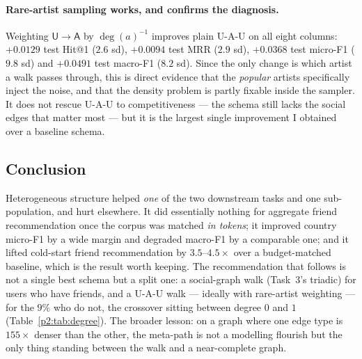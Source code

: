 \paragraph{Rare-artist sampling works, and confirms the diagnosis.}
Weighting $\mathsf{U}\to\mathsf{A}$ by $\deg(a)^{-1}$ improves plain \textsf{U-A-U} on all
eight columns: $+0.0129$ test Hit@1 ($2.6$ sd), $+0.0094$ test MRR ($2.9$ sd), $+0.0368$
test micro-F1 ($9.8$ sd) and $+0.0491$ test macro-F1 ($8.2$ sd).  Since the only change is
which artist a walk passes through, this is direct evidence that the \emph{popular} artists
specifically inject the noise, and that the density problem is partly fixable inside the
sampler.  It does not rescue \textsf{U-A-U} to competitiveness --- the schema still lacks
the social edges that matter most --- but it is the largest single improvement I obtained
over a baseline schema.

\subsection{Conclusion}
\label{p2:sec:conclusion}

Heterogeneous structure helped \emph{one} of the two downstream tasks and one
sub-population, and hurt elsewhere.  It did essentially nothing for aggregate friend
recommendation once the corpus was matched \emph{in tokens}; it improved country micro-F1
by a wide margin and degraded macro-F1 by a comparable one; and it lifted cold-start friend
recommendation by $3.5$--$4.5\times$ over a budget-matched baseline, which is the result
worth keeping.  The
recommendation that follows is not a single best schema but a split one: a social-graph walk
(Task~3's triadic) for users who have friends, and a \textsf{U-A-U} walk --- ideally with
rare-artist weighting --- for the $9\%$ who do not, the crossover sitting between degree $0$
and $1$ (Table~\ref{p2:tab:degree}).  The broader lesson: on a graph where one edge type is
$155\times$ denser than the other, the meta-path is not a modelling flourish but the only
thing standing between the walk and a near-complete graph.
